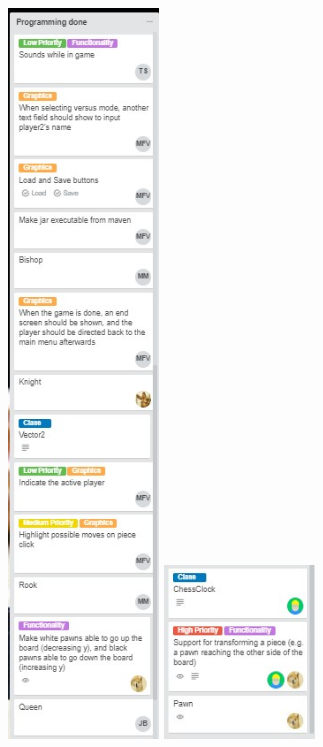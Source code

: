 \documentclass{article}
\begin{document}
\includegraphics[width=4cm]{20180503-programmingdone2.jpg}
\includegraphics[width=4cm]{20180503-programmingdone3.jpg}\\
\end{document}
